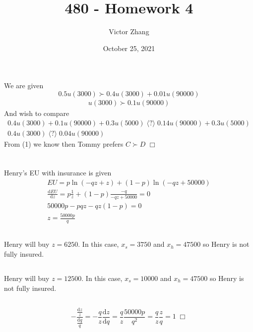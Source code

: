 \documentclass{article}
\title{480 - Homework 4}
\author{Victor Zhang}
\date{October 25, 2021}
\begin{document}
\maketitle

\section{}
We are given
$$0.5 u(3000) \succ 0.4 u(3000) + 0.01 u(90000)$$
\begin{gather}
u(3000) \succ 0.1 u(90000)
\end{gather}
And wish to compare
\begin{gather*}
0.4 u(3000) + 0.1 u(90000) + 0.3 u(5000) \; \langle ? \rangle\; 0.14 u(90000) + 0.3 u(5000)\\
0.4 u(3000) \; \langle ? \rangle \; 0.04 u(90000)
\end{gather*}
From (1) we know then Tommy prefers $C \succ D$ $\Box$

\section{}
Henry's EU with insurance is given
\begin{gather*}
EU = p\ln (-qz + z) + (1-p)\ln (-qz + 50000)\\
\frac{\mathrm{d}EU}{\mathrm{d}z} = p \frac{1}{z} + (1-p) \frac{-q}{-qz + 50000} = 0\\
50000p - pqz - qz(1-p) = 0\\
z = \frac{50000p}{q}
\end{gather*}

\subsection{}
Henry will buy $z = 6250$. In this case, $x_s = 3750$ and $x_h = 47500$ so Henry is not fully insured.

\subsection{}
Henry will buy $z = 12500$. In this case, $x_s = 10000$ and $x_h = 47500$ so Henry is not fully insured.

\subsection{}
$$- \frac{\frac{\mathrm{d}z}{z}}{\frac{\mathrm{d}q}{q}} = -\frac{q}{z} \frac{\mathrm{d}z}{\mathrm{d}q} = \frac{q}{z} \frac{50000p}{q^2} = \frac{q}{z} \frac{z}{q} = 1 \; \Box$$
\end{document}
